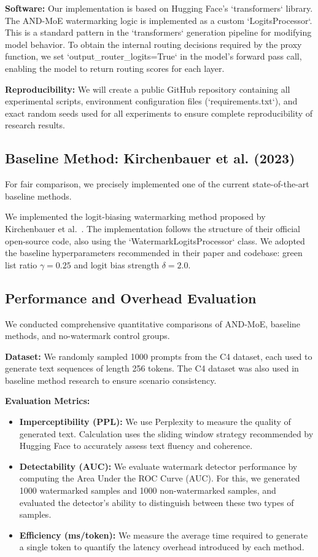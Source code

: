 \documentclass[letterpaper,twocolumn,10pt]{article}
\begin{document}
\textbf{Software:} Our implementation is based on Hugging Face's `transformers` library. The AND-MoE watermarking logic is implemented as a custom `LogitsProcessor`. This is a standard pattern in the `transformers` generation pipeline for modifying model behavior. To obtain the internal routing decisions required by the proxy function, we set `output_router_logits=True` in the model's forward pass call, enabling the model to return routing scores for each layer.

\textbf{Reproducibility:} We will create a public GitHub repository containing all experimental scripts, environment configuration files (`requirements.txt`), and exact random seeds used for all experiments to ensure complete reproducibility of research results.

\subsection{Baseline Method: Kirchenbauer et al. (2023)}

For fair comparison, we precisely implemented one of the current state-of-the-art baseline methods.

We implemented the logit-biasing watermarking method proposed by Kirchenbauer et al.~\cite{kirchenbauer2023watermark}. The implementation follows the structure of their official open-source code, also using the `WatermarkLogitsProcessor` class. We adopted the baseline hyperparameters recommended in their paper and codebase: green list ratio $\gamma=0.25$ and logit bias strength $\delta=2.0$.

\subsection{Performance and Overhead Evaluation}

We conducted comprehensive quantitative comparisons of AND-MoE, baseline methods, and no-watermark control groups.

\textbf{Dataset:} We randomly sampled 1000 prompts from the C4 dataset, each used to generate text sequences of length 256 tokens. The C4 dataset was also used in baseline method research to ensure scenario consistency.

\textbf{Evaluation Metrics:}

\begin{itemize}
\item \textbf{Imperceptibility (PPL):} We use Perplexity to measure the quality of generated text. Calculation uses the sliding window strategy recommended by Hugging Face to accurately assess text fluency and coherence.
\item \textbf{Detectability (AUC):} We evaluate watermark detector performance by computing the Area Under the ROC Curve (AUC). For this, we generated 1000 watermarked samples and 1000 non-watermarked samples, and evaluated the detector's ability to distinguish between these two types of samples.
\item \textbf{Efficiency (ms/token):} We measure the average time required to generate a single token to quantify the latency overhead introduced by each method.
\end{itemize}
\end{document}
